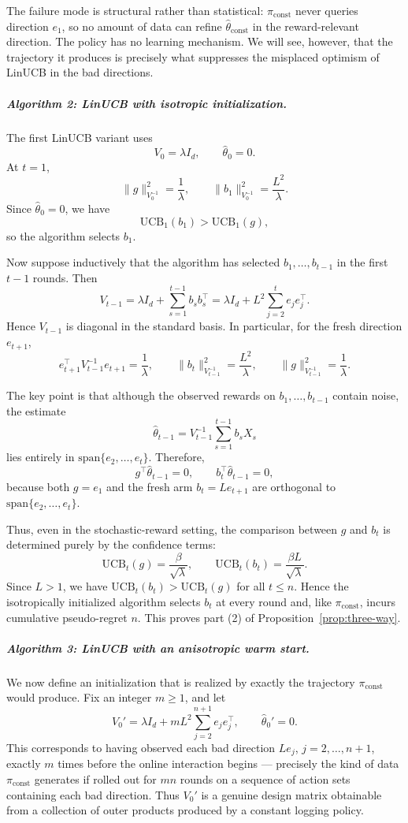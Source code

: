 \documentclass[anon]{alt2027} %
\begin{document}
The failure mode is structural rather than statistical: $\pi_{\mathrm{const}}$ never queries direction $e_1$, so no amount of data can refine $\hat{\theta}_{\mathrm{const}}$ in the reward-relevant direction. The policy has no learning mechanism. We will see, however, that the trajectory it produces is precisely what suppresses the misplaced optimism of LinUCB in the bad directions.

\subparagraph{Algorithm 2: LinUCB with isotropic initialization.}
The first LinUCB variant uses
\[
V_0=\lambda I_d,
\qquad
\hat{\theta}_0=0.
\]
At $t=1$,
\[
\|g\|_{V_0^{-1}}^2=\frac{1}{\lambda},
\qquad
\|b_1\|_{V_0^{-1}}^2=\frac{L^2}{\lambda}.
\]
Since $\hat{\theta}_0=0$, we have
\[
\mathrm{UCB}_1(b_1)>\mathrm{UCB}_1(g),
\]
so the algorithm selects $b_1$.

Now suppose inductively that the algorithm has selected $b_1,\dots,b_{t-1}$ in the first $t-1$ rounds. Then
\[
V_{t-1}
=
\lambda I_d+\sum_{s=1}^{t-1} b_s b_s^\top
=
\lambda I_d + L^2\sum_{j=2}^{t} e_j e_j^\top.
\]
Hence $V_{t-1}$ is diagonal in the standard basis. In particular, for the fresh direction $e_{t+1}$,
\[
e_{t+1}^\top V_{t-1}^{-1} e_{t+1}=\frac{1}{\lambda},
\qquad
\|b_t\|_{V_{t-1}^{-1}}^2=\frac{L^2}{\lambda},
\qquad
\|g\|_{V_{t-1}^{-1}}^2=\frac{1}{\lambda}.
\]

The key point is that although the observed rewards on $b_1,\dots,b_{t-1}$ contain noise, the estimate
\[
\hat{\theta}_{t-1}
=
V_{t-1}^{-1}\sum_{s=1}^{t-1} b_s X_s
\]
lies entirely in $\mathrm{span}\{e_2,\dots,e_t\}$. Therefore,
\[
g^\top \hat{\theta}_{t-1}=0,
\qquad
b_t^\top \hat{\theta}_{t-1}=0,
\]
because both $g=e_1$ and the fresh arm $b_t=L e_{t+1}$ are orthogonal to $\mathrm{span}\{e_2,\dots,e_t\}$.

Thus, even in the stochastic-reward setting, the comparison between $g$ and $b_t$ is determined purely by the confidence terms:
\[
\mathrm{UCB}_t(g)=\frac{\beta}{\sqrt{\lambda}},
\qquad
\mathrm{UCB}_t(b_t)=\frac{\beta L}{\sqrt{\lambda}}.
\]
Since $L>1$, we have $\mathrm{UCB}_t(b_t)>\mathrm{UCB}_t(g)$ for all $t\le n$. Hence the isotropically initialized algorithm selects $b_t$ at every round and, like $\pi_{\mathrm{const}}$, incurs cumulative pseudo-regret $n$. This proves part (2) of Proposition~\ref{prop:three-way}.

\subparagraph{Algorithm 3: LinUCB with an anisotropic warm start.}
We now define an initialization that is realized by exactly the trajectory $\pi_{\mathrm{const}}$ would produce. Fix an integer $m\ge 1$, and let
\[
V_0'
=
\lambda I_d + mL^2 \sum_{j=2}^{n+1} e_j e_j^\top,
\qquad
\hat{\theta}_0'=0.
\]
This corresponds to having observed each bad direction $L e_j$, $j=2,\dots,n+1$, exactly $m$ times before the online interaction begins --- precisely the kind of data $\pi_{\mathrm{const}}$ generates if rolled out for $mn$ rounds on a sequence of action sets containing each bad direction. Thus $V_0'$ is a genuine design matrix obtainable from a collection of outer products produced by a constant logging policy.
\end{document}
